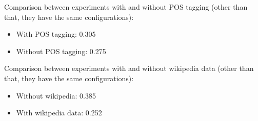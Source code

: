 Comparison between experiments with and without POS tagging (other than that, they have the same configurations):
\begin{itemize}
\item With POS tagging: 0.305
\item Without POS tagging: 0.275
\end{itemize}

Comparison between experiments with and without wikipedia data (other than that, they have the same configurations):
\begin{itemize}
\item Without wikipedia: 0.385
\item With wikipedia data: 0.252
\end{itemize}
